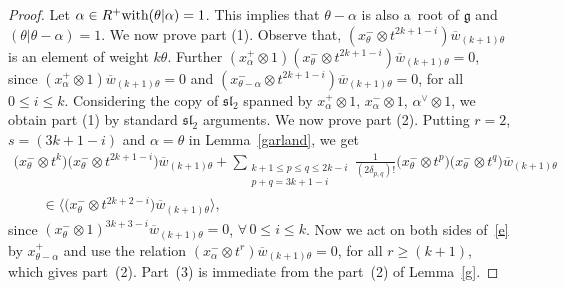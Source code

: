 \documentclass[10pt,a4paper]{amsart}
\begin{document}
\begin{proof}
Let $ \alpha \in R^{+} \textup{with} (\theta|\alpha)=1$. This implies that $\theta-\alpha$ is also a~root of
$\mathfrak{g}$ and $(\theta|\theta-\alpha)=1$. We now prove part (1).
Observe that, $(x^{-}_{\theta} \otimes t^{2k+1-i}) \overline{w}_{(k+1)\theta}$ is an element of weight $k\theta$.
Further $(x^{+}_{\alpha} \otimes 1) (x^{-}_{\theta} \otimes t^{2k+1-i}) \overline{w}_{(k+1)\theta}=0$, since
$(x^{+}_{\alpha} \otimes 1)\overline{w}_{(k+1)\theta}=0$ and $(x^{-}_{\theta-\alpha} \otimes t^{2k+1-i}) \overline{w}_{(k+1)\theta}=0$,
for all $0\leq i \leq k$.
Considering the copy of $\mathfrak{sl}_2$ spanned by $x^{+}_{\alpha} \otimes 1$, $x^{-}_{\alpha} \otimes 1$,
$\alpha^{\vee}\otimes 1$, we obtain part (1) by standard $\mathfrak{sl}_2$ arguments.
We now prove part (2).
Putting $r=2$, $s=(3k+1-i)$ and $\alpha=\theta$ in Lemma~\ref{garland}, we get
\begin{gather}
\big(x^{-}_{\theta} \otimes t^{k}\big) \big(x^{-}_{\theta} \otimes t^{2k+1-i}\big) \overline{w}_{(k+1)\theta} +
\sum\limits_{\substack{k+1\leq p\leq q \leq 2k-i\\p+q= 3k+1-i}}
\frac{1}{(2\delta_{p, q})!} \big(x^{-}_{\theta} \otimes t^{p}\big) \big(x^{-}_{\theta} \otimes t^{q}\big)
\overline{w}_{(k+1)\theta}
\nonumber\\
\qquad{}
\in
\big\langle\big(x^{-}_{\theta}\otimes t^{2k+2-i}\big) \overline{w}_{(k+1)\theta} \big\rangle, \label{e}
\end{gather}
since $(x^{-}_{\theta}\otimes 1)^{3k+3-i}\overline{w}_{(k+1)\theta}=0$, $\forall\, 0\leq i \leq k$.
Now we act on both sides of~\eqref{e} by $x^{+}_{\theta-\alpha}$ and use the relation $(x^{-}_{\alpha} \otimes t^r) \overline{w}_{(k+1)\theta}=0$,
for all $r\geq(k+1)$, which gives part~(2).
Part~(3) is immediate from the part~(2) of Lemma~\ref{g}.
\end{proof}
\end{document}
